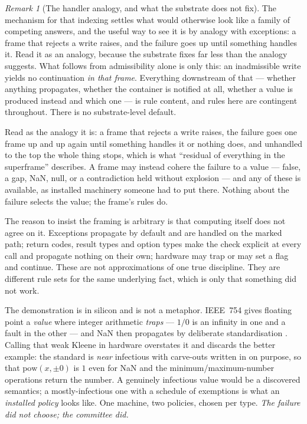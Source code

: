 \documentclass[11pt,a4paper]{article}
\theoremstyle{remark}\newtheorem{remark}[definition]{Remark}
\begin{document}
\begin{remark}[The handler analogy, and what the substrate does not fix]\label{rem:handler-analogy}
The mechanism for that indexing settles what would otherwise look like a family of competing answers,
and the useful way to see it is by analogy with exceptions: a frame that rejects a write raises, and the
failure goes up until something handles it. Read it as an analogy, because the substrate fixes
far less than the analogy suggests. What follows from admissibility alone is only this: an inadmissible
write yields no continuation \emph{in that frame}. Everything downstream of that --- whether anything
propagates, whether the container is notified at all, whether a value is produced instead and which
one --- is rule content, and rules here are contingent throughout. There is no substrate-level default.

Read as the analogy it is: a frame that rejects a write raises, the failure goes one frame up and up
again until something handles it or nothing does, and unhandled to the top the whole thing stops, which
is what ``residual of everything in the superframe'' describes. A frame may instead cohere the failure
to a value --- false, a gap, NaN, null, or a contradiction held without explosion --- and any of these
is available, as installed machinery someone had to put there. Nothing about the failure selects the
value; the frame's rules do.

The reason to insist the framing is arbitrary is that computing itself does not agree on it. Exceptions
propagate by default and are handled on the marked path; return codes, result types and option types
make the check explicit at every call and propagate nothing on their own; hardware may trap or may set
a flag and continue. These are not approximations of one true discipline. They are different rule sets
for the same underlying fact, which is only that something did not work.

The demonstration is in silicon and is not a metaphor. IEEE~754 gives floating point a \emph{value}
where integer arithmetic \emph{traps} --- $1/0$ is an infinity in one and a fault in the other --- and
NaN then propagates by deliberate standardisation \citep{ieee754}. Calling that weak Kleene in hardware
overstates it and discards the better example: the standard is \emph{near} infectious with carve-outs
written in on purpose, so that $\mathrm{pow}(x,\pm 0)$ is $1$ even for NaN and the
minimum/maximum-number operations return the number. A genuinely infectious value would be a discovered
semantics; a mostly-infectious one with a schedule of exemptions is what an \emph{installed policy}
looks like. One machine, two policies, chosen per type. \emph{The failure did not choose; the committee
did.}


\end{remark}
\end{document}
